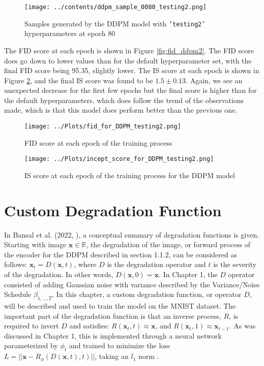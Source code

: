 \documentclass[12pt]{report} %
\begin{document}
\begin{figure}[ht]
  \centering
  \texttt{[image: ../contents/ddpm\_sample\_0080\_testing2.png]}
  \captionsetup{font=footnotesize}
  \caption{Samples generated by the DDPM model with \texttt{'testing2'} hyperparameters at epoch 80}
  \label{fig:ddpm_samples4}
\end{figure}
\newpage
The FID score at each epoch is shown in Figure \ref{fig:fid_ddpm2}. The FID score does go down to lower values than for the default hyperparameter set, with the final FID score being 95.35, slightly lower. The IS score at each epoch is shown in Figure \ref{fig:is_ddpm2}, and the final IS score was found to be $1.5 \pm 0.13$. Again, we see an unexpected decrease for the first few epochs but the final score is higher than for the default hyperparameters, which does follow the trend of the observations made, which is that this model does perform better than the previous one.

\begin{figure}[ht]
  \centering
  \texttt{[image: ../Plots/fid\_for\_DDPM\_testing2.png]}
  \captionsetup{font=footnotesize}
  \caption{FID score at each epoch of the training process}
  \label{fig:fid_ddpm2}

  \texttt{[image: ../Plots/incept\_score\_for\_DDPM\_testing2.png]}
  \captionsetup{font=footnotesize}
  \caption{IS score at each epoch of the training process for the DDPM model}
  \label{fig:is_ddpm2}
\end{figure}




\chapter{Custom Degradation Function}

In Bansal et al. (2022, \cite{bansal2022cold}), a conceptual summary of degradation functions is given. Starting with image $\mathbf{x} \in \mathbb{R}$, the degradation of the image, or forward process of the encoder for the DDPM described in section 1.1.2, can be considered as follows: $\mathbf{x}_{t} = D(\mathbf{x}, t)$, where $D$ is the degradation operator and $t$ is the severity of the degradation. In other words, $D(\mathbf{x}, 0) = \mathbf{x}$. In Chapter 1, the $D$ operator consisted of adding Gaussian noise with variance described by the Variance/Noise Schedule $\beta_{1, \dots, T}$. In this chapter, a custom degradation function, or operator $D$, will be described and used to train the model on the MNIST dataset. The important part of the degradation function is that an inverse process, $R$, is required to invert $D$ and satisfies: $R(\mathbf{x}_t, t) \approx \mathbf{x}$, and $R(\mathbf{x}_t, 1) \approx \mathbf{x}_{t-1}$. As was discussed in Chapter 1, this is implemented through a neural network parameterized by $\phi_{t}$ and trained to minimize the loss $L = ||\mathbf{x} - R_{\phi}(D(\mathbf{x}, t), t)||$, taking an $l_{1}$ norm \cite{bansal2022cold}.
\end{document}
